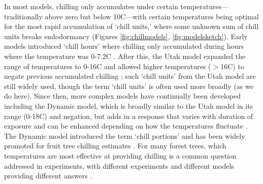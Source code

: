 \documentclass[11pt]{article}
\newcommand{\R}[1]{\label{#1}\linelabel{#1}}
\begin{document}
\R{r2modelsplsS}In most models, chilling only accumulates under certain temperatures---traditionally above zero but below 10\degree C---with certain temperatures being optimal for the most rapid accumulation of `chill units,' where some unknown sum of chill units breaks endodormancy (Figures \ref{fig:chillmodels}, \ref{fig:modelsketch}). Early models introduced `chill hours' where chilling only accumulated during hours where the temperature was 0-7.2\degree C \citep[corresponding to the range of 32-45\degree F developed for peach trees,][]{weinberger}. After this, the Utah model expanded the range of temperatures to 0-16\degree C and allowed higher temperatures ($>$16\degree C) to negate previous accumulated chilling \citep{richardson1974}; such `chill units' from the Utah model are still widely used, though the term `chill units' is often used more broadly (as we do here). Since then, more complex models have continually been developed including the Dynamic model, which is broadly similar to the Utah model in its range (0-18\degree C) and negation, but adds in a response that varies with duration of exposure and can be enhanced depending on how the temperatures fluctuate \citep{erez1987evaluation,erez1997dynamic,fishman1987temperature}. The Dynamic model introduced the term `chill portions' and has been widely promoted for fruit tree chilling estimates \citep{lued2009,luedeling2021phenoflex}. For many forest trees, which temperatures are most effective at providing chilling is a common question addressed in experiments, with different experiments and different models providing different answers \citep{vitasselev,baum2021}.\R{r2modelsplsE}
\end{document}
